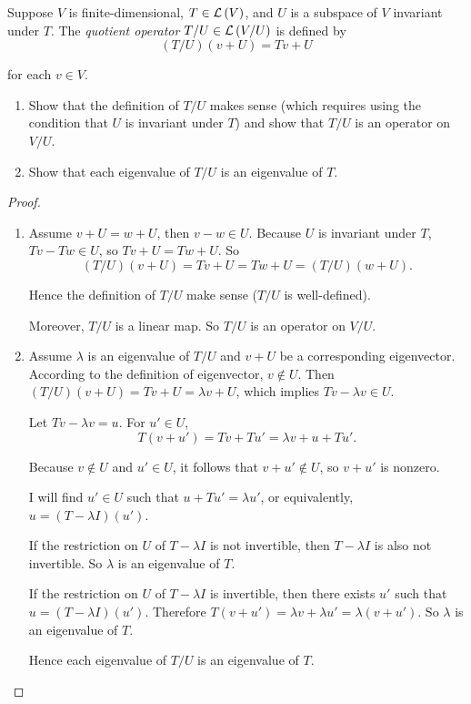 \begin{exercise}
    Suppose $V$ is finite-dimensional, $T\in\mathcal{L}\left({V}\right)$, and $U$ is a subspace of $V$ invariant under $T$. The \textit{quotient operator} $T/U\in\mathcal{L}\left({V/U}\right)$ is defined by
    \[
        (T/U)(v + U) = Tv + U
    \]

    for each $v\in V$.
    \begin{enumerate}[label={(\alph*)}]
        \item Show that the definition of $T/U$ makes sense (which requires using the
              condition that $U$ is invariant under $T$) and show that $T/U$ is an operator
              on $V/U$.
        \item Show that each eigenvalue of $T/U$ is an eigenvalue of $T$.
    \end{enumerate}
\end{exercise}

\begin{proof}
    \begin{enumerate}[label={(\alph*)}]
        \item Assume $v + U = w + U$, then $v - w\in U$. Because $U$ is invariant under $T$, $Tv - Tw\in U$, so $Tv + U = Tw + U$. So
              \[
                  (T/U)(v + U) = Tv + U = Tw + U = (T/U)(w + U).
              \]

              Hence the definition of $T/U$ make sense ($T/U$ is well-defined).

              Moreover, $T/U$ is a linear map. So $T/U$ is an operator on $V/U$.
        \item Assume $\lambda$ is an eigenvalue of $T/U$ and $v + U$ be a corresponding eigenvector. According to the definition of eigenvector, $v\notin U$. Then $(T/U)(v + U) = Tv + U = \lambda v + U$, which implies $Tv - \lambda v \in U$.

              Let $Tv - \lambda v = u$. For $u'\in U$,
              \[
                  T(v + u') = Tv + Tu' = \lambda v + u + Tu'.
              \]

              Because $v\notin U$ and $u'\in U$, it follows that $v + u'\notin U$, so $v + u'$ is nonzero.

              I will find $u'\in U$ such that $u + Tu' = \lambda u'$, or equivalently, $u = (T - \lambda I)(u')$.

              If the restriction on $U$ of $T - \lambda I$ is not invertible, then $T - \lambda I$ is also not invertible. So $\lambda$ is an eigenvalue of $T$.

              If the restriction on $U$ of $T - \lambda I$ is invertible, then there exists $u'$ such that $u = (T - \lambda I)(u')$. Therefore $T(v + u') = \lambda v + \lambda u' = \lambda (v + u')$. So $\lambda$ is an eigenvalue of $T$.

              Hence each eigenvalue of $T/U$ is an eigenvalue of $T$.
    \end{enumerate}
\end{proof}
\newpage

